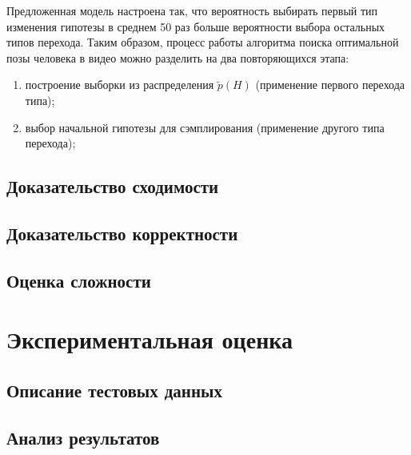 Предложенная модель настроена так, что вероятность выбирать первый тип изменения гипотезы в среднем 50 раз больше вероятности выбора остальных типов перехода. Таким образом, процесс работы алгоритма поиска оптимальной позы человека в видео можно разделить на два повторяющихся этапа:
\begin{enumerate}
	\item построение выборки из распределения $\tilde{p}(H)$ (применение первого перехода типа);
	\item выбор начальной гипотезы для сэмплирования (применение другого типа перехода);
\end{enumerate}

\subsection{Доказательство сходимости}
\subsection{Доказательство корректности}
\subsection{Оценка сложности}
\section{Экспериментальная оценка}
\subsection{Описание тестовых данных}
\subsection{Анализ результатов}
